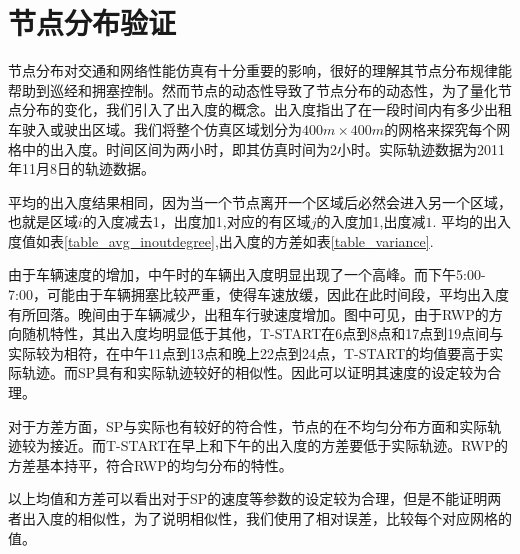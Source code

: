 \section{节点分布验证}

节点分布对交通和网络性能仿真有十分重要的影响，很好的理解其节点分布规律能帮助到巡经和拥塞控制。然而节点的动态性导致了节点分布的动态性，为了量化节点分布的变化，我们引入了出入度的概念。出入度指出了在一段时间内有多少出租车驶入或驶出区域。我们将整个仿真区域划分为$400m \times 400m$的网格来探究每个网格中的出入度。时间区间为两小时，即其仿真时间为2小时。实际轨迹数据为2011年11月8日的轨迹数据。

平均的出入度结果相同，因为当一个节点离开一个区域后必然会进入另一个区域，也就是区域$i$的入度减去1，出度加1,对应的有区域$j$的入度加1,出度减$1$. 平均的出入度值如表\ref{table_avg_inoutdegree},出入度的方差如表\ref{table_variance}.

由于车辆速度的增加，中午时的车辆出入度明显出现了一个高峰。而下午5:00-7:00，可能由于车辆拥塞比较严重，使得车速放缓，因此在此时间段，平均出入度有所回落。晚间由于车辆减少，出租车行驶速度增加。图中可见，由于RWP的方向随机特性，其出入度均明显低于其他，T-START在6点到8点和17点到19点间与实际较为相符，在中午11点到13点和晚上22点到24点，T-START的均值要高于实际轨迹。而SP具有和实际轨迹较好的相似性。因此可以证明其速度的设定较为合理。

对于方差方面，SP与实际也有较好的符合性，节点的在不均匀分布方面和实际轨迹较为接近。而T-START在早上和下午的出入度的方差要低于实际轨迹。RWP的方差基本持平，符合RWP的均匀分布的特性。

以上均值和方差可以看出对于SP的速度等参数的设定较为合理，但是不能证明两者出入度的相似性，为了说明相似性，我们使用了相对误差，比较每个对应网格的值。


